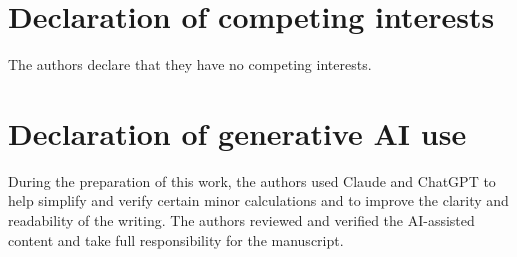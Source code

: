 \documentclass[12pt,a4paper]{amsart}
\numberwithin{equation}{section}
\theoremstyle{plain}
\theoremstyle{definition}
\begin{document}
\section*{Declaration of competing interests}
The authors declare that they have no competing interests.



\section*{Declaration of generative AI use}
During the preparation of this work, the authors used Claude and ChatGPT to help simplify and verify certain minor calculations and to improve the clarity and readability of the writing. The authors reviewed and verified the AI-assisted content and take full responsibility for the manuscript.






\setlength{\parskip}{0pt}
\end{document}
